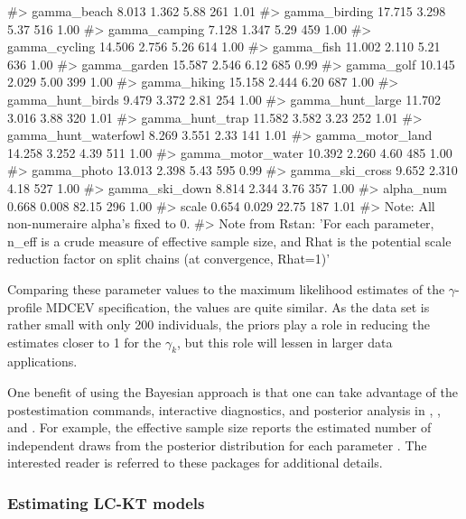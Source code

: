 \begin{Schunk}
\begin{Soutput}
#> gamma_beach             8.013   1.362   5.88   261 1.01
#> gamma_birding          17.715   3.298   5.37   516 1.00
#> gamma_camping           7.128   1.347   5.29   459 1.00
#> gamma_cycling          14.506   2.756   5.26   614 1.00
#> gamma_fish             11.002   2.110   5.21   636 1.00
#> gamma_garden           15.587   2.546   6.12   685 0.99
#> gamma_golf             10.145   2.029   5.00   399 1.00
#> gamma_hiking           15.158   2.444   6.20   687 1.00
#> gamma_hunt_birds        9.479   3.372   2.81   254 1.00
#> gamma_hunt_large       11.702   3.016   3.88   320 1.01
#> gamma_hunt_trap        11.582   3.582   3.23   252 1.01
#> gamma_hunt_waterfowl    8.269   3.551   2.33   141 1.01
#> gamma_motor_land       14.258   3.252   4.39   511 1.00
#> gamma_motor_water      10.392   2.260   4.60   485 1.00
#> gamma_photo            13.013   2.398   5.43   595 0.99
#> gamma_ski_cross         9.652   2.310   4.18   527 1.00
#> gamma_ski_down          8.814   2.344   3.76   357 1.00
#> alpha_num               0.668   0.008  82.15   296 1.00
#> scale                   0.654   0.029  22.75   187 1.01
#> Note: All non-numeraire alpha's fixed to 0. 
#> Note from Rstan: 'For each parameter, n_eff is a crude measure of effective sample size, and Rhat is the potential scale reduction factor on split chains (at convergence, Rhat=1)'
\end{Soutput}
\end{Schunk}

Comparing these parameter values to the maximum likelihood estimates of
the \(\gamma\)-profile MDCEV specification, the values are quite
similar. As the data set is rather small with only 200 individuals, the
priors play a role in reducing the estimates closer to 1 for the
\(\gamma_k\), but this role will lessen in larger data applications.

One benefit of using the Bayesian approach is that one can take
advantage of the postestimation commands, interactive diagnostics, and
posterior analysis in ,
\href{https://mc-stan.org/bayesplot/}{}
\citep{gabrybayesplot2019}, and
\href{http://mc-stan.org/shinystan/}{}
\citep{muthuser2018}. For example, the effective sample size reports the
estimated number of independent draws from the posterior distribution
for each parameter \citep{stan2019}. The interested reader is referred
to these packages for additional details.

\hypertarget{estimating-lc-kt-models}{%
\subsubsection{Estimating LC-KT models}\label{estimating-lc-kt-models}}

